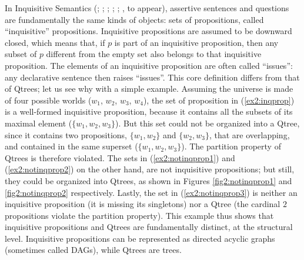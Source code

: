 In Inquisitive Semantics (; ; ; ; ; \citeauthor{Zhang2024}, to appear), assertive sentences and questions are fundamentally the same kinds of objects: sets of propositions, called ``inquisitive'' propositions. Inquisitive propositions are assumed to be downward closed, which means that, if $p$ is part of an inquisitive proposition, then any subset of $p$ different from the empty set also belongs to that inquisitive proposition. The elements of an inquisitive proposition are often called ``issues'': any declarative sentence then raises ``issues''. This core definition differs from that of Qtrees; let us see why with a simple example. Assuming the universe is made of four possible worlds ($w_1$, $w_2$, $w_3$, $w_4$), the set of proposition in (\ref{ex2:inqprop}) is a well-formed inquisitive proposition, because it contains all the subsets of its maximal element ($\lbrace w_1, w_2, w_3 \rbrace$). But this set could not be organized into a Qtree, since it contains two propositions, $\lbrace w_1, w_2 \rbrace$ and $\lbrace w_2, w_3 \rbrace$, that are overlapping, and contained in the same superset ($\lbrace w_1, w_2, w_3 \rbrace$). The partition property of Qtrees is therefore violated. The sets in (\ref{ex2:notinqprop1}) and (\ref{ex2:notinqprop2}) on the other hand, are not inquisitive propositions; but still, they could be organized into Qtrees, as shown in Figures \ref{fig2:notinqprop1} and \ref{fig2:notinqprop2} respectively. Lastly, the set in (\ref{ex2:notinqprop3}) is neither an inquisitive proposition (it is missing its singletons) nor a Qtree (the cardinal $2$ propositions violate the partition property). This example thus shows that inquisitive propositions and Qtrees are fundamentally distinct, at the structural level. Inquisitive propositions can be represented as directed acyclic graphs (sometimes called DAGs), while Qtrees are trees.

\begin{exe}
	\ex \begin{xlist}
	 \label{ex2:inqprop}
	 \label{ex2:notinqprop1}
	 \label{ex2:notinqprop2}
	 \label{ex2:notinqprop3}
	\end{xlist}
\end{exe}

